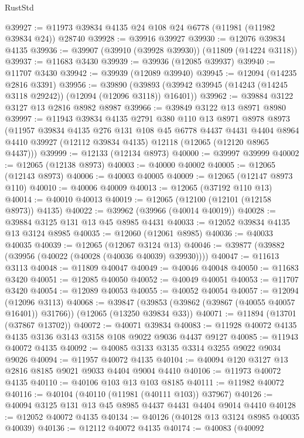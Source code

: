 \begin{lexlean}{RustStd}
\begin{coremodule}
@39927 := @11973 @39834 @4135 @24 @108 @24 @6778 (@11981 (@11982 @39834 @24)) @28740
@39928 := @39916 @39927
@39930 := @12076 @39834 @4135
@39936 := @39907 (@39910 (@39928 @39930)) (@11809 (@14224 @3118))
@39937 := @11683 @3430
@39939 := @39936 (@12085 @39937)
@39940 := @11707 @3430
@39942 := @39939 (@12089 @39940)
@39945 := @12094 (@14235 @2816 @3391)
@39956 := @39890
    (@39893 (@39942 @39945 (@14243 (@14245 @3118 @29242)) (@12094 (@12096 @3118)) @16401))
@39962 := @39884 @3122 @3127 @13 @2816 @8982 @8987
@39966 := @39849 @3122 @13 @8971 @8980
@39997 := @11943
    @39834
    @4135
    @2791
    @380
    @110
    @13
    @8971
    @8978
    @8973
    (@11957
      @39834
      @4135
      @276
      @131
      @108
      @45
      @6778
      @4437
      @4431
      @4404
      @8964
      @4410
      @39927
      (@12112 @39834 @4135)
      @12118
      (@12065 (@12120 @8965 @4437)))
@39999 := @12133 (@12134 @8973)
@40000 := @39997 @39999
@40002 := @12065 (@12138 @8973)
@40003 := @40000 @40002
@40005 := @12065 (@12143 @8973)
@40006 := @40003 @40005
@40009 := @12065 (@12147 @8973 @110)
@40010 := @40006 @40009
@40013 := @12065 (@37192 @110 @13)
@40014 := @40010 @40013
@40019 := @12065 (@12100 (@12101 (@12158 @8973)) @4135)
@40022 := @39962 (@39966 (@40014 @40019))
@40028 := @39884 @3125 @131 @13 @45 @8985 @4431
@40033 := @12052 @39834 @4135 @13 @3124 @8985
@40035 := @12060 (@12061 @8985)
@40036 := @40033 @40035
@40039 := @12065 (@12067 @3124 @13)
@40046 := @39877 (@39882 (@39956 (@40022 (@40028 (@40036 @40039) @39930))))
@40047 := @11613 @3113
@40048 := @11809 @40047
@40049 := @40046 @40048
@40050 := @11683 @3420
@40051 := @12085 @40050
@40052 := @40049 @40051
@40053 := @11707 @3420
@40054 := @12089 @40053
@40055 := @40052 @40054
@40057 := @12094 (@12096 @3113)
@40068 := @39847
    (@39853 (@39862 (@39867 (@40055 @40057 @16401)) @31766))
    (@12065 (@13250 @39834 @33))
@40071 := @11894 (@13701 (@37867 @13702))
@40072 := @40071 @39834
@40083 := @11928 @40072 @4135 @4135 @3136 @3143 @3158 @108 @9022 @9036 @4437 @9127
@40085 := @11943 @40072 @4135
@40092 := @40085 @3133 @3135 @3314 @3255 @9022 @9034 @9026
@40094 := @11957 @40072 @4135
@40104 := @40094 @120 @3127 @13 @2816 @8185 @9021 @9033 @4404 @9004 @4410
@40106 := @11973 @40072 @4135
@40110 := @40106 @103 @13 @103 @8185
@40111 := @11982 @40072
@40116 := @40104 (@40110 (@11981 (@40111 @103)) @37967)
@40126 := @40094 @3125 @131 @13 @45 @8985 @4437 @4431 @4404 @9014 @4410
@40128 := @12052 @40072 @4135
@40134 := @40126 (@40128 @13 @3124 @8985 @40035 @40039)
@40136 := @12112 @40072 @4135
@40174 := @40083
    (@40092

\end{coremodule}
\end{lexlean}

